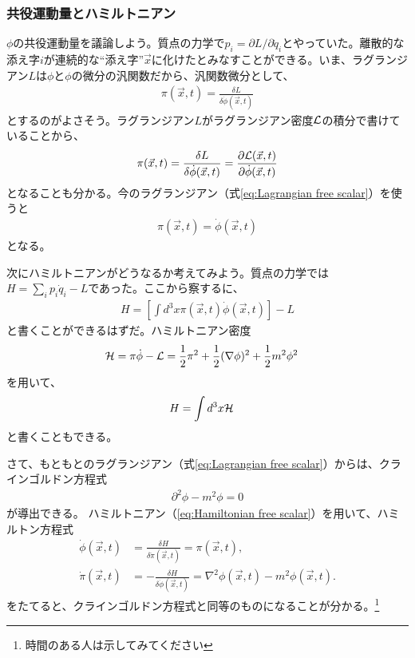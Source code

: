 \documentclass[10pt,a4paper]{jarticle}
\begin{document}
\subsubsection{共役運動量とハミルトニアン}
$\phi$の共役運動量を議論しよう。質点の力学で$p_i = \partial L / \partial \dot q_i$とやっていた。離散的な添え字$i$が連続的な``添え字''$\vec x$に化けたとみなすことができる。いま、ラグランジアン$L$は$\phi$と$\phi$の微分の汎関数だから、汎関数微分として、
\begin{align}
\pi(\vec x, t) = \frac{\delta L}{\delta \dot \phi(\vec x,t)}
\end{align}
とするのがよさそう。ラグランジアン$L$がラグランジアン密度${\cal L}$の積分で書けていることから、
\begin{align}
\pi(\vec x, t) = \frac{\delta L}{\delta \dot\phi(\vec x,t)} = \frac{\partial {\cal L}(\vec x, t)}{\partial \dot\phi(\vec x, t)}
\end{align}
となることも分かる。今のラグランジアン（式\ref{eq:Lagrangian free scalar}）を使うと
\begin{align}
\pi(\vec x, t) = \dot\phi(\vec x, t)
\end{align}
となる。

次にハミルトニアンがどうなるか考えてみよう。質点の力学では$H = \sum_i p_i \dot q_i - L$であった。ここから察するに、
\begin{align}
H = \left[ \int d^3 x \pi(\vec x, t) \dot\phi(\vec x,t) \right]- L
\end{align}
と書くことができるはずだ。ハミルトニアン密度
\begin{align}
{\cal H} &= \pi \dot\phi - {\cal L} = \frac{1}{2}\pi^2 + \frac{1}{2}(\nabla\phi)^2 + \frac{1}{2}m^2 \phi^2
\end{align}
を用いて、
\begin{align}
H &= \int d^3x {\cal H} \label{eq:Hamiltonian free scalar}
\end{align}
と書くこともできる。

さて、もともとのラグランジアン（式\ref{eq:Lagrangian free scalar}）からは、クラインゴルドン方程式
\begin{align}
\partial^2 \phi - m^2 \phi = 0
\end{align}
が導出できる。
ハミルトニアン（\ref{eq:Hamiltonian free scalar}）を用いて、ハミルトン方程式
\begin{align}
\dot\phi(\vec x,t) &= \frac{\delta H}{\delta\dot\pi(\vec x,t)} = \pi(\vec x ,t), \\
\dot\pi(\vec x,t) &= -\frac{\delta H}{\delta\dot\phi(\vec x,t)} = \nabla^2 \phi(\vec x,t) - m^2 \phi(\vec x,t).
\end{align}
をたてると、クラインゴルドン方程式と同等のものになることが分かる。\footnote{時間のある人は示してみてください}
\end{document}
